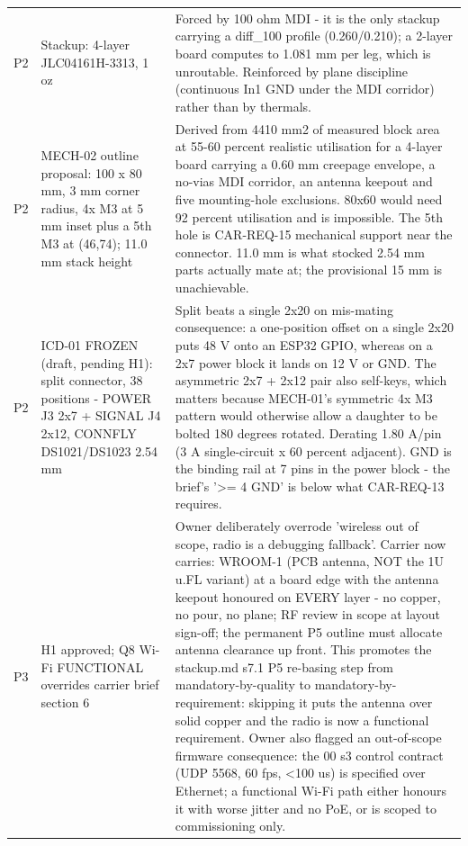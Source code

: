 \documentclass[11pt,a4paper]{article}
\begin{document}
{\begin{longtable}{lp{5.2cm}p{7.2cm}}
P2 & Stackup: 4-layer JLC04161H-3313, 1 oz & Forced by 100 ohm MDI - it is the only stackup carrying a diff\_100 profile (0.260/0.210); a 2-layer board computes to 1.081 mm per leg, which is unroutable. Reinforced by plane discipline (continuous In1 GND under the MDI corridor) rather than by thermals. \\
P2 & MECH-02 outline proposal: 100 x 80 mm, 3 mm corner radius, 4x M3 at 5 mm inset plus a 5th M3 at (46,74); 11.0 mm stack height & Derived from 4410 mm2 of measured block area at 55-60 percent realistic utilisation for a 4-layer board carrying a 0.60 mm creepage envelope, a no-vias MDI corridor, an antenna keepout and five mounting-hole exclusions. 80x60 would need 92 percent utilisation and is impossible. The 5th hole is CAR-REQ-15 mechanical support near the connector. 11.0 mm is what stocked 2.54 mm parts actually mate at; the provisional 15 mm is unachievable. \\
P2 & ICD-01 FROZEN (draft, pending H1): split connector, 38 positions - POWER J3 2x7 + SIGNAL J4 2x12, CONNFLY DS1021/DS1023 2.54 mm & Split beats a single 2x20 on mis-mating consequence: a one-position offset on a single 2x20 puts 48 V onto an ESP32 GPIO, whereas on a 2x7 power block it lands on 12 V or GND. The asymmetric 2x7 + 2x12 pair also self-keys, which matters because MECH-01's symmetric 4x M3 pattern would otherwise allow a daughter to be bolted 180 degrees rotated. Derating 1.80 A/pin (3 A single-circuit x 60 percent adjacent). GND is the binding rail at 7 pins in the power block - the brief's '\textgreater{}= 4 GND' is below what CAR-REQ-13 requires. \\
P3 & H1 approved; Q8 Wi-Fi FUNCTIONAL overrides carrier brief section 6 & Owner deliberately overrode 'wireless out of scope, radio is a debugging fallback'. Carrier now carries: WROOM-1 (PCB antenna, NOT the 1U u.FL variant) at a board edge with the antenna keepout honoured on EVERY layer - no copper, no pour, no plane; RF review in scope at layout sign-off; the permanent P5 outline must allocate antenna clearance up front. This promotes the stackup.md s7.1 P5 re-basing step from mandatory-by-quality to mandatory-by-requirement: skipping it puts the antenna over solid copper and the radio is now a functional requirement. Owner also flagged an out-of-scope firmware consequence: the 00 s3 control contract (UDP 5568, 60 fps, \textless{}100 us) is specified over Ethernet; a functional Wi-Fi path either honours it with worse jitter and no PoE, or is scoped to commissioning only. \\

\end{longtable}}
\end{document}
